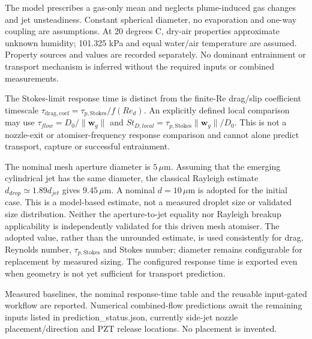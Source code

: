 The model prescribes a gas-only mean and neglects plume-induced gas changes and
jet unsteadiness. Constant spherical diameter, no evaporation and one-way coupling
are assumptions. At 20 degrees C, dry-air properties approximate unknown humidity;
101.325 kPa and equal water/air temperature are assumed. Property sources and
values are recorded separately. No dominant entrainment or transport mechanism
is inferred without the required inputs or combined measurements.

The Stokes-limit response time is distinct from the finite-Re drag/slip coefficient
timescale $\tau_{\mathrm{drag,coef}}=\tau_{p,\mathrm{Stokes}}/f(Re_d)$.
An explicitly defined local comparison may use $\tau_{flow}=D_0/\lVert\boldsymbol w_g\rVert$
and $St_{D,local}=\tau_{p,\mathrm{Stokes}}\lVert\boldsymbol w_g\rVert/D_0$.
This is not a nozzle-exit or atomiser-frequency response comparison and cannot
alone predict transport, capture or successful entrainment.

The nominal mesh aperture diameter is $5\,\mu\mathrm{m}$. Assuming that the
emerging cylindrical jet has the same diameter, the classical Rayleigh estimate
$d_{drop}\simeq1.89d_{jet}$ gives $9.45\,\mu\mathrm{m}$. A nominal
$d=10\,\mu\mathrm{m}$ is adopted for the initial case. This is a model-based
estimate, not a measured droplet size or validated size distribution. Neither
the aperture-to-jet equality nor Rayleigh breakup applicability is independently
validated for this driven mesh atomiser. The adopted value, rather than the
unrounded estimate, is used consistently for drag, Reynolds number,
$\tau_{p,\mathrm{Stokes}}$ and Stokes number; diameter remains configurable
for replacement by measured sizing. The configured response time is exported
even when geometry is not yet sufficient for transport prediction.

Measured baselines, the nominal response-time table and the reusable input-gated workflow are reported. Numerical combined-flow predictions await the remaining inputs listed in prediction_status.json, currently side-jet nozzle placement/direction and PZT release locations. No placement is invented.

